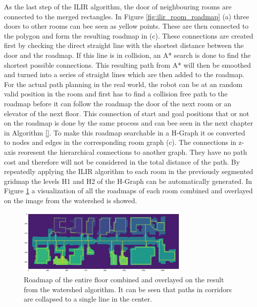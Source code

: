 As the last step of the ILIR algorithm, the door of neighbouring rooms are connected to the merged rectangles. In Figure \ref{fig:ilir_room_roadmap} (a) three doors to other rooms can bee seen as yellow points. These are then connected to the polygon and form the resulting roadmap in (c). These connections are created first by checking the direct straight line with the shortest distance between the door and the roadmap. If this line is in collision, an A* search is done to find the shortest possible connections. This resulting path from A* will then be smoothed and turned into a series of straight lines which are then added to the roadmap. For the actual path planning in the real world, the robot can be at an random valid position in the room and first has to find a collision free path to the roadmap before it can follow the roadmap the door of the next room or an elevator of the next floor. This connection of start and goal positions that or not on the roadmap is done by the same process and can bee seen in the next chapter in Algorithm \ref{}. To make this roadmap searchable in a H-Graph it os converted to nodes and edges in the corresponding room graph (c). The connections in z-axis reoresent the hierarchical connections to another graph. They have no path cost and therefore will not be considered in the total distance of the path. By repeatedly applying the ILIR algorithm to each room in the previously segmented gridmap the levels H1 and H2 of the H-Graph can be automatically generated. In Figure \ref{fig:ryu_roadmap} a visualization of all the roadmaps of each room combined and overlayed on the image from the watershed is showed.

\begin{figure}[h]
    \centering
    \includegraphics[width=0.75\textwidth]{figures/50_implementation/ryu_roadmap.png}
    \caption[Roadmap of the entire floor combined]{Roadmap of the entire floor combined and overlayed on the result from the watershed algorithm. It can be seen that paths in corridors are collapsed to a single line in the center.}
    \label{fig:ryu_roadmap}
\end{figure}

